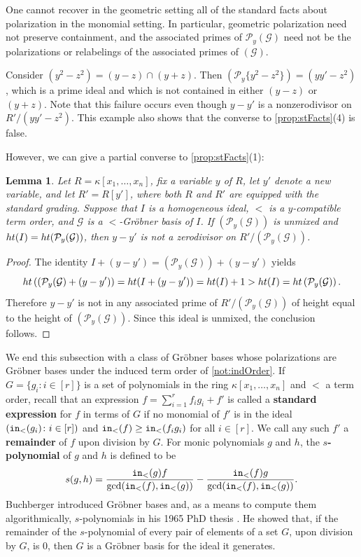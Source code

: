 \documentclass[12pt, reqno]{amsart}
\numberwithin{equation}{section}
\newtheorem{lemma}[theorem]{Lemma}
\newtheorem{Main Conjecture}[theorem]{Main Conjecture}
\theoremstyle{definition}
\newenvironment{example}
  {\pushQED{\qed}\renewcommand{\qedsymbol}{$\diamondsuit$}\examplex}
  {\popQED\endexamplex}
\theoremstyle{plain}
\newcommand{\init}{{\tt in}}
\newcommand{\hgt}{{\rm{ht }}}
\newcommand{\G}{\mathcal{G}}
\renewcommand{\P}{\mathcal{P}}
\begin{document}
    One cannot recover in the geometric setting all of the standard facts about polarization in the monomial setting.  In particular, geometric polarization need not preserve containment, and the associated primes of $\P_y(\G)$ need not be the polarizations or relabelings of the associated primes of $(\G)$.

\begin{example}
  Consider $(y^2-z^2) = (y-z) \cap (y+z)$.  Then $(\P_y \{y^2-z^2\}) = (yy'-z^2)$, which is a prime ideal and which is not contained in either $(y-z)$ or $(y+z)$.  Note that this failure occurs even though $y-y'$ is a nonzerodivisor on $R'/(yy'-z^2)$.  This example also shows that the converse to \cref{prop:stFacts}(4) is false.
 \end{example} 

However, we can give a partial converse to \cref{prop:stFacts}(1):

\begin{lemma}
Let $R = \kappa[x_1, \ldots, x_n]$, fix a variable $y$ of $R$, let $y'$ denote a new variable, and let $R' = R[y']$, where both $R$ and $R'$ are equipped with the standard grading. Suppose that $I$ is a homogeneous ideal, $<$ is a $y$-compatible term order, and $\G$ is a $<$-Gr\"obner basis of $I$.  If $(\P_y(\G))$ is unmixed and $\hgt(I)=\hgt(\P_y(\G))$,  then $y-y'$ is not a zerodivisor on $R'/(\P_y(\G))$.
\end{lemma} 
\begin{proof}
    

    The identity
    $
    I+(y-y')=(\P_y(\G))+(y-y')
    $
    yields 
    \[
    \hgt\left((\P_y(\G)+(y-y')\right)=\hgt( I+(y-y'))=\hgt(I)+1>\hgt(I)=\hgt\left(\P_y(\G)\right).
    \]
Therefore $y-y'$ is not in any associated prime of $R'/(\P_y(\G))$ of height equal to the height of $(\P_y(\G))$. Since this ideal is unmixed, the conclusion follows.
\end{proof}





We end this subsection with a class of Gr\"obner bases whose polarizations are Gr\"obner bases under the induced term order of  \cref{not:indOrder}. If $G = \{g_i \colon i \in [r]\}$ is a set of polynomials in the ring $\kappa[x_1, \ldots, x_n]$ and $<$ a term order, recall that an expression $f = \sum_{i=1}^r f_i g_i+f'$ is called a \textbf{standard expression} for $f$ in terms of $G$ if no monomial of $f'$ is in the ideal $(\init_<(g_i) \colon i \in [r])$ and $\init_<(f) \geq \init_<(f_i g_i)$ for all $i \in [r]$. We call any such $f'$ a \textbf{remainder} of $f$ upon division by $G$.  For monic polynomials $g$ and $h$, the \textbf{$s$-polynomial} of $g$ and $h$ is defined to be \[
s(g,h) = \dfrac{\init_<(g)f}{\gcd(\init_<(f),\init_<(g))}-\dfrac{\init_<(f)g}{\gcd(\init_<(f),\init_<(g))}.
\]
Buchberger introduced Gr\"obner bases and, as a means to compute them algorithmically, $s$-polynomials in his 1965 PhD thesis \cite{Buc65}. He showed that, if the remainder of the $s$-polynomial of every pair of elements of a set $G$, upon division by $G$, is $0$, then $G$ is a Gr\"obner basis for the ideal it generates.
\end{document}
